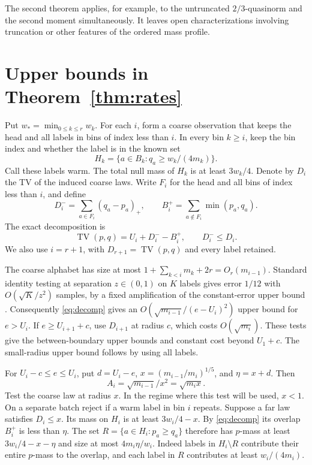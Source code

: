 \documentclass[11pt]{article}
\newcommand{\TV}{\operatorname{TV}}
\begin{document}
The second theorem applies, for example, to the untruncated \(2/3\)-quasinorm and the second moment simultaneously. It leaves open characterizations involving truncation or other features of the ordered mass profile.

\section{Upper bounds in Theorem~\ref{thm:rates}}

Put \(w_*=\min_{0\le k\le r} w_k\). For each \(i\), form a coarse observation that keeps the head and all labels in bins of index less than \(i\). In every bin \(k\ge i\), keep the bin index and whether the label is in the known set
\[
 H_k=\{a\in B_k:q_a\ge w_k/(4m_k)\}.
\]
Call these labels warm. The total null mass of \(H_k\) is at least \(3w_k/4\). Denote by \(D_i\) the TV of the induced coarse laws. Write \(F_i\) for the head and all bins of index less than \(i\), and define
\[
 D_i^- = \sum_{a\in F_i}(q_a-p_a)_+,
 \qquad B_i^+=\sum_{a\notin F_i}\min(p_a,q_a).
\]
The exact decomposition is
\begin{equation}\label{eq:decomp}
   \TV(p,q)=U_i+D_i^- - B_i^+,\qquad D_i^-\le D_i.
\end{equation}
We also use \(i=r+1\), with \(D_{r+1}=\TV(p,q)\) and every label retained.

The coarse alphabet has size at most \(1+\sum_{k<i}m_k+2r=O_r(m_{i-1})\). Standard identity testing at separation \(z\in(0,1)\) on \(K\) labels gives error \(1/12\) with \(O(\sqrt K/z^2)\) samples, by a fixed amplification of the constant-error upper bound \cite{dgpp}. Consequently \eqref{eq:decomp} gives an \(O(\sqrt{m_{i-1}}/(e-U_i)^2)\) upper bound for \(e>U_i\). If \(e\ge U_{i+1}+c\), use \(D_{i+1}\) at radius \(c\), which costs \(O(\sqrt{m_i})\). These tests give the between-boundary upper bounds and constant cost beyond \(U_1+c\). The small-radius upper bound follows by using all labels.

For \(U_i-c\le e\le U_i\), put \(d=U_i-e\), \(x=(m_{i-1}/m_i)^{1/5}\), and \(\eta=x+d\). Then
\begin{equation}\label{eq:balance}
  A_i=\sqrt{m_{i-1}}/x^2=\sqrt{m_i x}.
\end{equation}
Test the coarse law at radius \(x\). In the regime where this test will be used, \(x<1\). On a separate batch reject if a warm label in bin \(i\) repeats. Suppose a far law satisfies \(D_i\le x\). Its mass on \(H_i\) is at least \(3w_i/4-x\). By \eqref{eq:decomp} its overlap \(B_i^+\) is less than \(\eta\). The set \(R=\{a\in H_i:p_a\ge q_a\}\) therefore has \(p\)-mass at least \(3w_i/4-x-\eta\) and size at most \(4m_i\eta/w_i\). Indeed labels in \(H_i\setminus R\) contribute their entire \(p\)-mass to the overlap, and each label in \(R\) contributes at least \(w_i/(4m_i)\).
\end{document}
